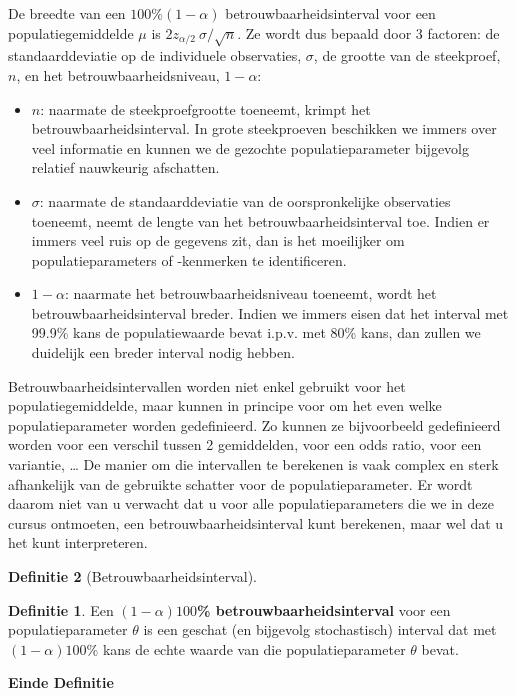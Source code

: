 \documentclass[
  12pt,dutch,coursenotes]{book}
\theoremstyle{definition}
\newtheorem{definition}{Definitie}[chapter]
\theoremstyle{definition}
\theoremstyle{definition}
\theoremstyle{remark}
\begin{document}
De breedte van een \(100\%(1-\alpha)\) betrouwbaarheidsinterval voor een
populatiegemiddelde \(\mu\) is \(2 z_{\alpha/2} \ \sigma/\sqrt{n}\). Ze wordt
dus bepaald door 3 factoren: de standaarddeviatie op de individuele
observaties, \(\sigma\), de grootte van de steekproef, \(n\), en het
betrouwbaarheidsniveau, \(1-\alpha\):

\begin{itemize}
\item
  \(n\): naarmate de steekproefgrootte toeneemt, krimpt het
  betrouwbaarheidsinterval. In grote steekproeven beschikken we immers over veel informatie en kunnen we de gezochte populatieparameter bijgevolg relatief nauwkeurig afschatten.
\item
  \(\sigma\): naarmate de standaarddeviatie van de oorspronkelijke
  observaties toeneemt, neemt de lengte van het betrouwbaarheidsinterval toe. Indien er immers veel ruis op de gegevens zit, dan is het moeilijker om populatieparameters of -kenmerken te identificeren.
\item
  \(1-\alpha\): naarmate het betrouwbaarheidsniveau toeneemt, wordt het
  betrouwbaarheidsinterval breder. Indien we immers eisen dat het interval met 99.9\% kans de populatiewaarde bevat i.p.v. met 80\% kans, dan zullen we duidelijk een breder interval nodig hebben.
\end{itemize}

Betrouwbaarheidsintervallen worden niet enkel gebruikt voor het
populatiegemiddelde, maar kunnen in principe voor om het even welke
populatieparameter worden gedefinieerd. Zo kunnen ze bijvoorbeeld
gedefinieerd worden voor een verschil tussen 2 gemiddelden, voor een odds ratio, voor een variantie, \ldots{} De manier om die
intervallen te berekenen is vaak complex en sterk afhankelijk van de
gebruikte schatter voor de populatieparameter. Er wordt daarom niet van u
verwacht dat u voor alle populatieparameters die we in deze cursus
ontmoeten, een betrouwbaarheidsinterval kunt berekenen, maar wel dat u het
kunt interpreteren.

\begin{definition}[Betrouwbaarheidsinterval]
\begin{definition}

\protect\hypertarget{def:unnamed-chunk-149}{}{\label{def:unnamed-chunk-149} \iffalse (Betrouwbaarheidsinterval) \fi{} }Een \textbf{\((1-\alpha)100\)\% betrouwbaarheidsinterval} voor een populatieparameter \(\theta\) is een
geschat (en bijgevolg stochastisch) interval dat met \((1-\alpha)100\)\% kans
de echte waarde van die populatieparameter \(\theta\) bevat.

\textbf{Einde Definitie}

\end{definition}
\end{definition}
\end{document}
